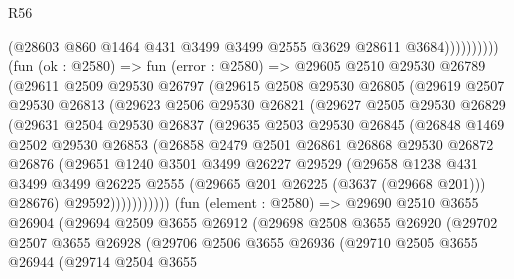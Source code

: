 \begin{lexlean}{R56}
\begin{coremodule}
                          (@28603 @860 @1464 @431 @3499 @3499 @2555 @3629 @28611 @3684))))))))))
        (fun (ok : @2580) =>
        fun (error : @2580) =>
        @29605
          @2510
          @29530
          @26789
          (@29611
            @2509
            @29530
            @26797
            (@29615
              @2508
              @29530
              @26805
              (@29619
                @2507
                @29530
                @26813
                (@29623
                  @2506
                  @29530
                  @26821
                  (@29627
                    @2505
                    @29530
                    @26829
                    (@29631
                      @2504
                      @29530
                      @26837
                      (@29635
                        @2503
                        @29530
                        @26845
                        (@26848
                          @1469
                          @2502
                          @29530
                          @26853
                          (@26858
                            @2479
                            @2501
                            @26861
                            @26868
                            @29530
                            @26872
                            @26876
                            (@29651
                              @1240
                              @3501
                              @3499
                              @26227
                              @29529
                              (@29658
                                @1238
                                @431
                                @3499
                                @3499
                                @26225
                                @2555
                                (@29665 @201 @26225 (@3637 (@29668 @201)))
                                @28676)
                              @29592)))))))))))
        (fun (element : @2580) =>
        @29690
          @2510
          @3655
          @26904
          (@29694
            @2509
            @3655
            @26912
            (@29698
              @2508
              @3655
              @26920
              (@29702
                @2507
                @3655
                @26928
                (@29706
                  @2506
                  @3655
                  @26936
                  (@29710
                    @2505
                    @3655
                    @26944
                    (@29714
                      @2504
                      @3655

\end{coremodule}
\end{lexlean}
